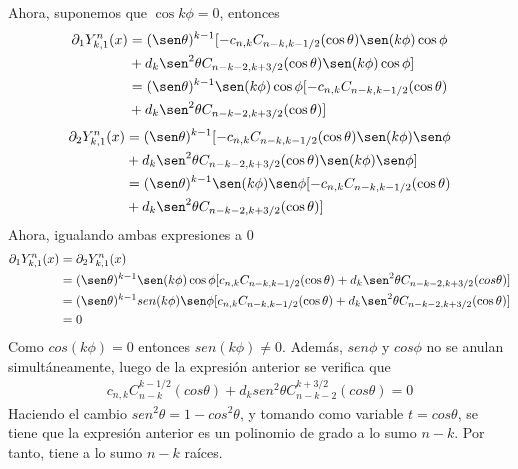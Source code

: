 Ahora, suponemos que $\cos k\phi = 0 $, entonces
\begin{gather}
\begin{aligned}
 \partial_1  Y_{k,1}^n(x) &= (\sen\theta)^{k-1}[-c_{n,k}C_{n-k,k-1/2}(\cos \theta)\sen(k\phi)\cos\phi \\&+ d_k \sen^2\theta C_{n-k-2,k+3/2}(\cos \theta)\sen(k\phi)\cos\phi] \\ &= (\sen\theta)^{k-1}\sen(k\phi)\cos\phi[-c_{n,k}C_{n-k,k-1/2}(\cos \theta) 
\\&+ d_k \sen^2\theta C_{n-k-2,k+3/2}(\cos \theta)]
\end{aligned}
\end{gather}
\begin{gather}
\begin{aligned}
\partial_2  Y_{k,1}^n(x) &= (\sen\theta)^{k-1}[-c_{n,k}C_{n-k,k-1/2}(\cos \theta)\sen(k\phi)\sen\phi \\&+ d_k \sen^2\theta C_{n-k-2,k+3/2}(\cos \theta)\sen(k\phi)\sen\phi] \\ &= (\sen\theta)^{k-1}\sen(k\phi)\sen\phi[-c_{n,k}C_{n-k,k-1/2}(\cos \theta) \\&+ d_k \sen^2\theta C_{n-k-2,k+3/2}(\cos \theta)]
\end{aligned}
\end{gather}
Ahora, igualando ambas expresiones a 0
\begin{gather}
\begin{aligned}
	\partial_1  Y_{k,1}^n(x) &= \partial_2  Y_{k,1}^n(x)  \\ &= (\sen\theta)^{k-1}\sen(k\phi)\cos\phi[c_{n,k}C_{n-k,k-1/2}(\cos \theta) + d_k \sen^2\theta C_{n-k-2,k+3/2}(cos \theta)]  \\ &= (\sen\theta)^{k-1}sen(k\phi)\sen\phi[c_{n,k}C_{n-k,k-1/2}(\cos \theta) + d_k \sen^2\theta C_{n-k-2,k+3/2}(\cos \theta)] \\ &= 0
\end{aligned}
\end{gather}
Como $cos (k	\phi) = 0 $ entonces $sen  (k\phi) \neq 0$. Además, $sen \phi$ y $cos\phi$ no se anulan simultáneamente, luego de la expresión anterior se verifica que
\begin{gather*}
c_{n,k}C_{n-k}^{k-1/2}(cos \theta) + d_k sen^2\theta C_{n-k-2}^{k+3/2}(cos \theta) = 0
\end{gather*}
Haciendo el cambio $sen^2 \theta = 1-cos^2\theta$, y tomando como variable $t=cos\theta$, se tiene que la expresión anterior es un polinomio de grado a lo sumo $n-k$. Por tanto, tiene a lo sumo $n-k$ raíces.

